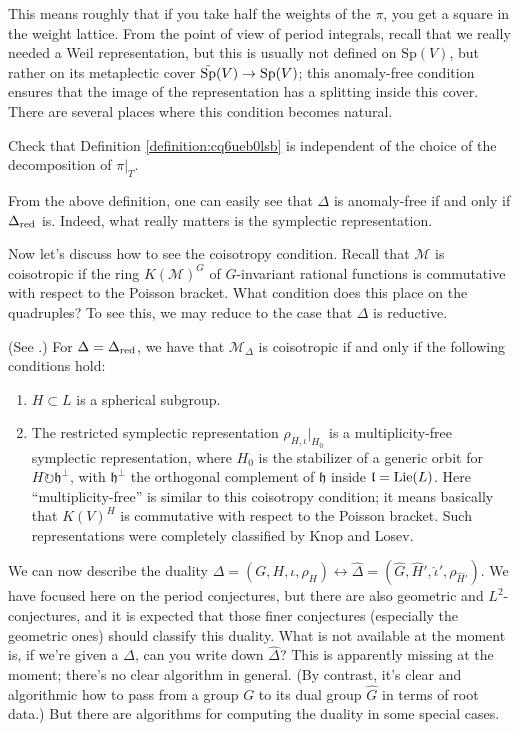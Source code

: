 \documentclass[reqno]{amsart} 
\numberwithin{theorem}{section}
\numberwithin{equation}{section}
\numberwithin{exercise}{section}
\begin{document}
This means roughly that if you take half the weights of the $\pi$, you get a square in the weight lattice.  From the point of view of period integrals, recall that we really needed a Weil representation, but this is usually not defined on $\mathrm{Sp}(V)$, but rather on its metaplectic cover $\tilde{\operatorname{Sp}}(V) \rightarrow\mathrm{Sp}(V)$; this anomaly-free condition ensures that the image of the representation has a splitting inside this cover.  There are several places where this condition becomes natural.
\begin{exercise}\label{exercise:cq6ueb0ys0}
  Check that Definition \ref{definition:cq6ueb0lsb} is independent of the choice of the decomposition of $\pi |_T$.
\end{exercise}
\begin{remark}
  From the above definition, one can easily see that $\Delta$ is anomaly-free if and only if $\Delta_{\operatorname{red}}$ is.  Indeed, what really matters is the symplectic representation.
\end{remark}
Now let's discuss how to see the coisotropy condition.  Recall that $\mathcal{M}$ is coisotropic if the ring $K(\mathcal{M})^G$ of $G$-invariant rational functions is commutative with respect to the Poisson bracket.  What condition does this place on the quadruples?  To see this, we may reduce to the case that $\Delta$ is reductive.
\begin{proposition}
  (See \cite[\S3]{2024arXiv2409.04677}.)  For $\Delta = \Delta_{\operatorname{red}}$, we have that $\mathcal{M}_\Delta$ is coisotropic if and only if the following conditions hold:
  \begin{enumerate}
  \item\label{enumerate:cq6ueeom44} $H \subset L$ is a spherical subgroup.
  \item\label{enumerate:cq6ueeon2w} The restricted symplectic representation $\rho_{H, \iota} |_{H_0}$ is a multiplicity-free symplectic representation, where $H_0$ is the stabilizer of a generic orbit for $H \circlearrowright \mathfrak{h}^\perp$, with $\mathfrak{h}^\perp$ the orthogonal complement of $\mathfrak{h}$ inside $\mathfrak{l} = \operatorname{Lie}(L)$.  Here ``multiplicity-free'' is similar to this coisotropy condition; it means basically that $K(V)^{H}$ is commutative with respect to the Poisson bracket.  Such representations were completely classified by Knop and Losev.
  \end{enumerate}
\end{proposition}
We can now describe the duality $\Delta =(G, H, \iota, \rho_H) \longleftrightarrow \hat{\Delta} =(\hat{G}, \hat{H}', \hat{\iota}', \rho_{\hat{H}'})$.  We have focused here on the period conjectures, but there are also geometric and $L^2$-conjectures, and it is expected that those finer conjectures (especially the geometric ones) should classify this duality.  What is not available at the moment is, if we're given a $\Delta$, can you write down $\hat{\Delta}$?  This is apparently missing at the moment; there's no clear algorithm in general.  (By contrast, it's clear and algorithmic how to pass from a group $G$ to its dual group $\hat{G}$ in terms of root data.)  But there are algorithms for computing the duality in some special cases.
\end{document}
